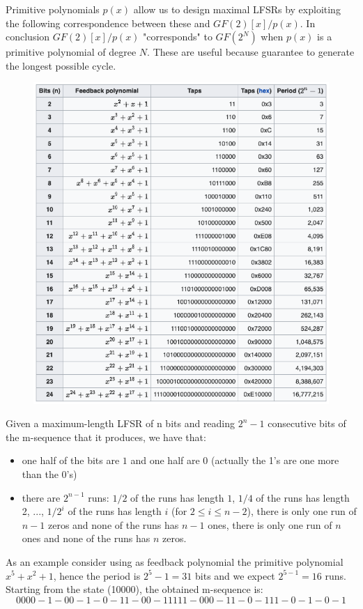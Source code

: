 Primitive polynomials $p(x)$ allow us to design maximal LFSRs by exploiting the following correspondence between these and $GF(2)[x]/p(x)$. In conclusion $GF(2)[x]/p(x)$ "corresponds" to $GF(2^N)$ when $p(x)$ is a primitive polynomial of degree $N$. These are useful because guarantee to generate the longest possible cycle.

\begin{figure}
	\centering
	\includegraphics[width=0.7\linewidth]{Images/Chapter2/screenshot007}
	\caption{}
	\label{fig:chapter2_screenshot007}
\end{figure}

Given a maximum-length LFSR of n bits and reading $2^n - 1$ consecutive bits of the m-sequence that it produces, we have that:

\begin{itemize}
	\item one half of the bits are $1$ and one half are $0$ (actually the 1’s are one more than the 0’s)
	\item there are $2^{n-1}$ runs: $1/2$ of the runs has length $1$, $1/4$ of the runs has length 2, ..., $1/2^i$ of the runs has length $i$ (for $2 \le i \le n - 2$), there is only one run of $n-1$ zeros and none of the runs has $n-1$ ones, there is only one run of $n$ ones and none of the runs has $n$ zeros.
\end{itemize}

As an example consider using as feedback polynomial the primitive polynomial $x^5 + x^2 + 1$, hence the period is $2^5 - 1 = 31$ bits and we expect $2^{5-1} = 16$ runs. Starting from the state (10000), the obtained m-sequence is:
$$0000-1-00-1-0-11-00-11111-000-11-0-111-0-1-0-1$$

